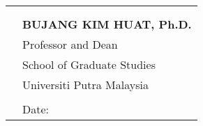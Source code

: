 \begin{singlespace}



\vfill

\begin{table}[b!]
\begin{tabular}{ll}
\hspace{5.5cm} &                            \\
\cline{2-2}  \vspace{-.3cm}               \\
             & {\bf BUJANG KIM HUAT, Ph.D.}   \\
             & Professor and Dean         \\
             & School of Graduate Studies \\
             & Universiti Putra Malaysia  \\
             &                            \\
             & Date:                     \\
\end{tabular}
\end{table}
\end{singlespace}




